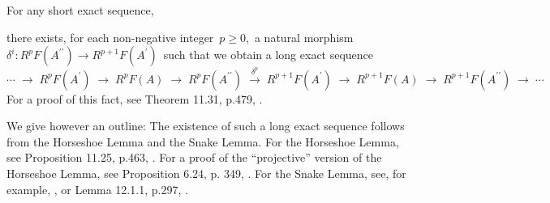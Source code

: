 \begin{itemize}
	For any short exact sequence,
	\begin{center}
	\end{center}
	there exists, for each non-negative integer \,$p \geq 0$,\,
	a natural morphism
	\,$\delta^{i} : R^{p}F(A^{\prime\prime}) \longrightarrow R^{p+1}F(A^{\prime})$\,
	such that we obtain a long exact sequence
	\begin{equation*}
	\cdots
	\;\longrightarrow\; R^{p}F(A^{\prime})
	\;\longrightarrow\; R^{p}F(A)
	\;\longrightarrow\; R^{p}F(A^{\prime\prime})
	\;\overset{\delta^{p}}{\longrightarrow}\; R^{p+1}F(A^{\prime})
	\;\longrightarrow\; R^{p+1}F(A)
	\;\longrightarrow\; R^{p+1}F(A^{\prime\prime})
	\;\longrightarrow\; \cdots
	\end{equation*}
	For a proof of  this fact, see Theorem 11.31, p.479, \cite{gallier2022homology}.

	We give however an outline: The existence of such a long exact sequence follows
	from the Horseshoe Lemma and the Snake Lemma.
	For the Horseshoe Lemma, see Proposition 11.25, p.463, \cite{gallier2022homology}.
	For a proof of the ``projective'' version of the Horseshoe Lemma,
	see Proposition 6.24, p. 349, \cite{rotman2008introduction}.
	For the Snake Lemma, see, for example, \cite{Surowski2000}, or
	Lemma 12.1.1, p.297, \cite{kashiwara2005categories}.


\end{itemize}
